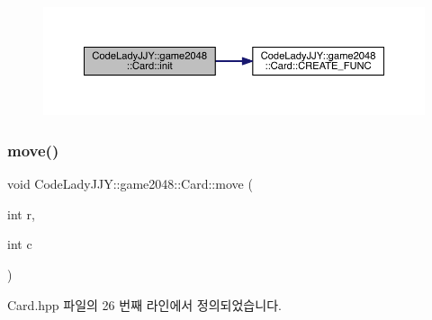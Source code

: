\nopagebreak
\begin{figure}[H]
\begin{center}
\leavevmode
\includegraphics[width=350pt]{d6/d12/class_code_lady_j_j_y_1_1game2048_1_1_card_a5efe85fbf1117b9a64cc13311352284c_cgraph}
\end{center}
\end{figure}
\mbox{\label{class_code_lady_j_j_y_1_1game2048_1_1_card_a6ad341b10626a9cc1aafe8229fa61ea6}} 
\subsubsection{\texorpdfstring{move()}{move()}}
{\footnotesize\ttfamily void Code\+Lady\+J\+J\+Y\+::game2048\+::\+Card\+::move (\begin{DoxyParamCaption}\item[{int}]{r,  }\item[{int}]{c }\end{DoxyParamCaption})\hspace{0.3cm}{\ttfamily [inline]}}



Card.\+hpp 파일의 26 번째 라인에서 정의되었습니다.



